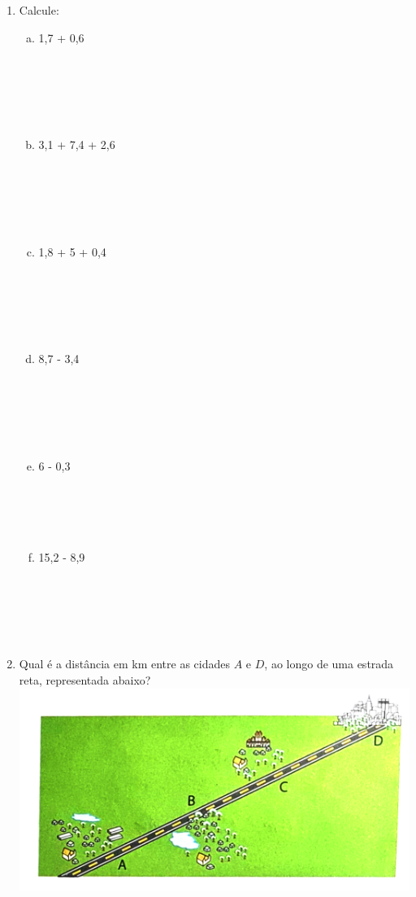 \documentclass[a4paper,14pt]{article}
\begin{document}
\begin{multicols}{2}
\begin{enumerate}
    			\item Calcule:
    			\begin{enumerate}[a)]
    				\item 1,7 + 0,6 \\\\\\\\\\\\
    				\item 3,1 + 7,4 + 2,6 \\\\\\\\\\\\
    				\item 1,8 + 5 + 0,4 \\\\\\\\\\\\
    				\item 8,7 - 3,4 \\\\\\\\\\\\
    				\item 6 - 0,3 \\\\\\\\\\
    				\item 15,2 - 8,9 \\\\\\\\\\\\
    			\end{enumerate}
    			\item Qual é a distância em km entre as cidades $A$ e $D$, ao longo de uma estrada reta, representada abaixo? \\
    			\includegraphics[width=1.1\linewidth]{6FMA56_imagens/imagem1}

\end{enumerate}
\end{multicols}
\end{document}
